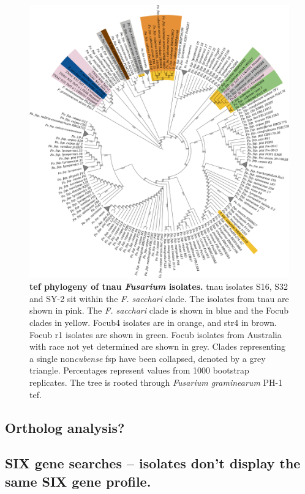 \begin{figure}[h!]
    \centering
    \includegraphics[width=14cm]{Figures/TEF1aPhylo-Including_mindanoense.png}
    \caption[\Acl{tef} phylogeny of \acl{tnau} \textit{Fusarium} isolates.]{\textbf{\Acl{tef} phylogeny of \acl{tnau} \textit{Fusarium} isolates.} \Ac{tnau} isolates S16, S32 and SY-2 sit within the\textit{ F. sacchari} clade. The isolates from \ac{tnau} are shown in pink. The \textit{F. sacchari} clade is shown in blue and the \acl{Focub} clades in yellow. \Acl{Focub4} isolates are in orange, and \ac{str4} in brown. \Ac{Focub} \acl{r1} isolates are shown in green. \ac{Focub} isolates from Australia with race not yet determined are shown in grey. Clades representing a single non\-\textit{cubense} \ac{fsp} have been collapsed, denoted by a grey triangle.  Percentages represent values from 1000 bootstrap replicates. The tree is rooted through \textit{Fusarium graminearum} PH-1 \ac{tef}.}
    \label{fig:TEF1aPhylo}
\end{figure}


\subsection{Ortholog analysis?}

\subsection{SIX gene searches – isolates don’t display the same SIX gene profile.}

